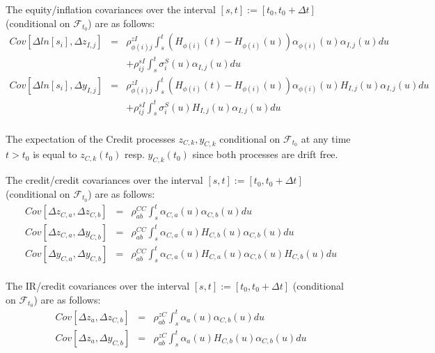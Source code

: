 \documentclass[12pt, a4paper]{article}
\begin{document}
{{\begin{appendix}
The equity/inflation covariances over the interval $[s,t] := [t_0, t_0+\Delta t]$ (conditional on $\mathcal{F}_{t_0}$) are as follows:
\begin{eqnarray*}
	Cov \left[\Delta ln[s_i], \Delta z_{I,j} \right] &=&
	\rho_{\phi(i)j}^{zI} \int_s^t (H_{\phi(i)} (t) - H_{\phi(i)} (u)) \alpha_{\phi(i)} (u) \alpha_{I,j} (u) du\\
	&&+ \rho_{ij}^{sI} \int_s^t \sigma_i^S (u) \alpha_{I,j} (u) du\\	
	Cov \left[\Delta ln[s_i], \Delta y_{I,j} \right] &=&
	\rho_{\phi(i)j}^{zI} \int_s^t (H_{\phi(i)} (t) - H_{\phi(i)} (u)) \alpha_{\phi(i)} (u) H_{I,j} (u) \alpha_{I,j} (u) du\\
	&&+ \rho_{ij}^{sI} \int_s^t \sigma_i^S (u) H_{I,j} (u) \alpha_{I,j} (u) du\\
\end{eqnarray*}

The expectation of the Credit processes $z_{C,k}, y_{C,k}$ conditional on $\mathcal{F}_{t_0}$ at any time $t>t_0$ is
equal to $z_{C,k}(t_0)$ resp. $y_{C,k}(t_0)$ since both processes are drift free.

The credit/credit covariances over the interval $[s,t] := [t_0, t_0+\Delta t]$ (conditional on $\mathcal{F}_{t_0}$) are as follows:
\begin{eqnarray*}
	Cov \left[\Delta z_{C,a}, \Delta z_{C,b} \right] &=&
	\rho_{ab}^{CC}\int_s^t \alpha_{C, a}(u) \alpha_{C, b}(u) du\\
  Cov \left[\Delta z_{C,a}, \Delta y_{C,b} \right] &=&
	\rho_{ab}^{CC}\int_s^t \alpha_{C, a}(u) H_{C,b}(u) \alpha_{C, b}(u) du\\
  Cov \left[\Delta y_{C,a}, \Delta y_{C,b} \right] &=&
	\rho_{ab}^{CC}\int_s^t \alpha_{C, a}(u) H_{C,a}(u) \alpha_{C, b}(u) H_{C,b}(u) du\\
\end{eqnarray*}

The IR/credit covariances over the interval $[s,t] := [t_0, t_0+\Delta t]$ (conditional on $\mathcal{F}_{t_0}$) are as follows:
\begin{eqnarray*}
	Cov \left[\Delta z_a, \Delta z_{C,b} \right] &=&
	\rho_{ab}^{zC}\int_s^t \alpha_a(u) \alpha_{C, b}(u) du\\
  Cov \left[\Delta z_a, \Delta y_{C,b} \right] &=&
	\rho_{ab}^{zC}\int_s^t \alpha_a(u) H_{C,b}(u) \alpha_{C, b}(u) du\\
\end{eqnarray*}


\end{appendix}}}
\end{document}
